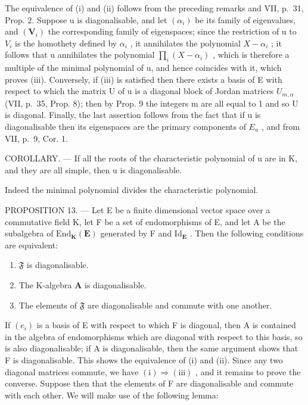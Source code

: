 The equivalence of (i) and (ii) follows from the preceding remarks and VII, p.~31, Prop. 2. Suppose u is diagonalisable, and let \((\alpha_{i})\) be its family of eigenvalues, and \((\mathbf{V}_{i})\) the corresponding family of eigenspaces; since the restriction of u to \(V_{i}\) is the homothety defined by \(\alpha_{i}\) , it annihilates the polynomial \(X - \alpha_{i}\) ; it follows that u annihilates the polynomial \(\prod_{i}(X - \alpha_{i})\) , which is therefore a multiple of the minimal polynomial of u, and hence coincides with it, which proves (iii). Conversely, if (iii) is satisfied then there exists a basis of E with respect to which the matrix U of u is a diagonal block of Jordan matrices \(U_{m,\alpha}\) (VII, p.~35, Prop. 8); then by Prop. 9 the integers m are all equal to 1 and so U is diagonal. Finally, the last assertion follows from the fact that if u is diagonalisable then its eigenspaces are the primary components of \(E_{u}\) , and from VII, p.~9, Cor. 1.

COROLLARY. --- If all the roots of the characteristic polynomial of u are in K, and they are all simple, then u is diagonalisable.

Indeed the minimal polynomial divides the characteristic polynomial.

PROPOSITION 13. --- Let E be a finite dimensional vector space over a commutative field K, let F be a set of endomorphisms of E, and let A be the subalgebra of \(\mathrm{End}_{\mathbf{K}}(\mathbf{E})\) generated by F and \(\mathrm{Id}_{\mathbf{E}}\) . Then the following conditions are equivalent:

\begin{enumerate}
\def\labelenumi{(\roman{enumi})}
\item
  \(\mathfrak{F}\) is diagonalisable.
\item
  The K-algebra \(\mathbf{A}\) is diagonalisable.
\item
  The elements of \(\mathfrak{F}\) are diagonalisable and commute with one another.
\end{enumerate}

If \((e_{i})\) is a basis of E with respect to which F is diagonal, then A is contained in the algebra of endomorphisms which are diagonal with respect to this basis, so is also diagonalisable; if A is diagonalisable, then the same argument shows that F is diagonalisable. This shows the equivalence of (i) and (ii). Since any two diagonal matrices commute, we have \((\mathrm{i}) \Rightarrow (\mathrm{iii})\) , and it remains to prove the converse. Suppose then that the elements of F are diagonalisable and commute with each other. We will make use of the following lemma:


